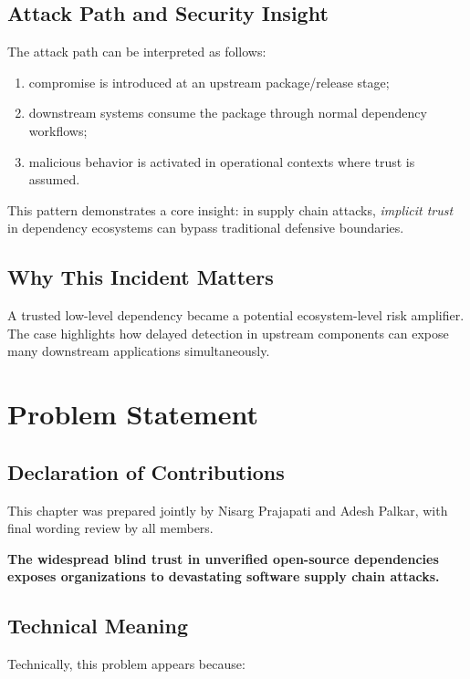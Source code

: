 \section{Attack Path and Security Insight}

The attack path can be interpreted as follows:

\begin{enumerate}
\item compromise is introduced at an upstream package/release stage;
\item downstream systems consume the package through normal dependency workflows;
\item malicious behavior is activated in operational contexts where trust is assumed.
\end{enumerate}

This pattern demonstrates a core insight: in supply chain attacks, \emph{implicit trust}
in dependency ecosystems can bypass traditional defensive boundaries.

\section{Why This Incident Matters}

A trusted low-level dependency became a potential ecosystem-level risk amplifier.
The case highlights how delayed detection in upstream components can expose many downstream
applications simultaneously.

\chapter{Problem Statement}
\label{ch:problem}

\section*{Declaration of Contributions}
This chapter was prepared jointly by Nisarg Prajapati and Adesh Palkar,
with final wording review by all members.

\textbf{The widespread blind trust in unverified open-source dependencies exposes organizations
to devastating software supply chain attacks.}

\section{Technical Meaning}

Technically, this problem appears because:

